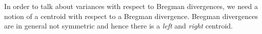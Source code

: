 \documentclass[
	twoside=false, %
]{kaobook}
\begin{document}
%
%
%
In order to talk about variances with respect to Bregman divergences, we need a notion of a centroid with respect to a Bregman divergence. Bregman divergences are in general not symmetric and hence there is a \textit{left} and \textit{right} centroid.
\end{document}

